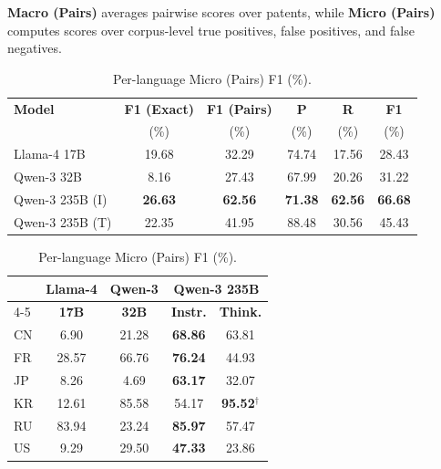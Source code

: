 \noindent\textbf{Macro (Pairs)} averages pairwise scores over patents, while \textbf{Micro (Pairs)} computes scores over corpus-level true positives, false positives, and false negatives.


\begin{table}[t]
\centering

\begin{minipage}{0.48\textwidth}
\centering
\caption{Overall evaluation across all languages.}
\label{tab:overall}
\footnotesize
\setlength{\tabcolsep}{3pt}
\begin{tabular}{lccccc}
\toprule
\textbf{Model} & \textbf{F1 (Exact)} & \textbf{F1 (Pairs)} & \textbf{P} & \textbf{R} & \textbf{F1} \\
& (\%) & (\%) & (\%) & (\%) & (\%) \\
\midrule
Llama-4 17B & 19.68 & 32.29 & 74.74 & 17.56 & 28.43 \\
Qwen-3 32B  &  8.16 & 27.43 & 67.99 & 20.26 & 31.22 \\
Qwen-3 235B (I) & \textbf{26.63} & \textbf{62.56} & \textbf{71.38} & \textbf{62.56} & \textbf{66.68} \\
Qwen-3 235B (T) & 22.35 & 41.95 & 88.48 & 30.56 & 45.43 \\
\bottomrule
\end{tabular}
\end{minipage}
\hfill
\begin{minipage}{0.48\textwidth}
\centering
\caption{Per-language Micro (Pairs) F1 (\%).}
\label{tab:lang}
\footnotesize
\setlength{\tabcolsep}{4pt}
\begin{tabular}{lcccc}
\toprule
& \textbf{Llama-4} & \textbf{Qwen-3} & \multicolumn{2}{c}{\textbf{Qwen-3 235B}} \\
\cmidrule(lr){4-5}
& \textbf{17B} & \textbf{32B} & \textbf{Instr.} & \textbf{Think.} \\
\midrule
CN & 6.90 & 21.28 & \textbf{68.86} & 63.81 \\
FR & 28.57 & 66.76 & \textbf{76.24} & 44.93 \\
JP & 8.26 & 4.69 & \textbf{63.17} & 32.07 \\
KR & 12.61 & 85.58 & 54.17 & \textbf{95.52}$^\dagger$ \\
RU & 83.94 & 23.24 & \textbf{85.97} & 57.47 \\
US & 9.29 & 29.50 & \textbf{47.33} & 23.86 \\
\bottomrule
\end{tabular}
\end{minipage}

\end{table}


